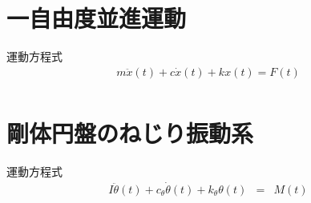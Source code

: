 \documentclass[a4paper]{jsarticle}
\begin{document}
\section{一自由度並進運動}
\begin{itembox}[l]{運動方程式}
    \begin{eqnarray*}
        m\ddot{x}\left(t\right)+c\dot{x}\left(t\right)+kx\left(t\right)=F\left(t\right)\\
    \end{eqnarray*}
\end{itembox}
\section{剛体円盤のねじり振動系}
\begin{itembox}[l]{運動方程式}
    \begin{eqnarray*}
        I\ddot{\theta}\left(t\right)+c_\theta\dot{\theta}\left(t\right)+k_\theta\theta\left(t\right)&=&M\left(t\right)\\
    \end{eqnarray*}
\end{itembox}
\end{document}
